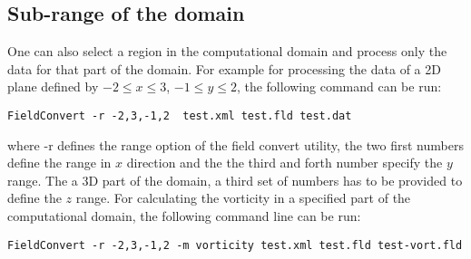 \subsection{Sub-range of the domain}
One can also select a region in the computational domain and process only the data for that part of the domain. For example for processing the data of a 2D plane defined by $-2\leq x \leq 3$, $-1\leq y \leq 2$, the following command can be run:\\
\begin{lstlisting}[style=BashInputStyle]
FieldConvert -r -2,3,-1,2  test.xml test.fld test.dat
\end{lstlisting}
where -r defines the range option of the field convert utility, the two first numbers define the range in $x$ direction and the the third and forth number specify the $y$ range. The a 3D part of the domain, a third set of numbers has to be provided to define the $z$ range. For calculating the vorticity in a specified part of the computational domain, the following command line can be run:\\
\begin{lstlisting}[style=BashInputStyle]
FieldConvert -r -2,3,-1,2 -m vorticity test.xml test.fld test-vort.fld
\end{lstlisting}

